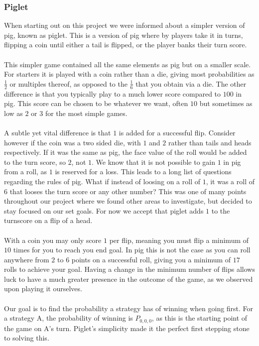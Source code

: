 \documentclass[a4paper,titlepage]{article}
\begin{document}
\subsubsection{Piglet}
When starting out on this project we were informed about a simpler version of pig, known as piglet. This is a version of pig
where by players take it in turns, flipping a coin until either a tail is flipped, or the player banks their turn score.
\\
\\
This simpler game contained all the same elements as pig but on a smaller scale. For starters it is played with a coin rather than a die,
giving most probabilities as $\frac{1}{2}$ or multiples thereof, as opposed to the $\frac{1}{6}$ that you obtain via a die.
The other difference is that you typically play to a much lower score compared to $100$ in pig. This score can be chosen to be whatever we want, often $10$ but sometimes as low as $2$ or $3$ for the most simple games.
\\
\\
A subtle yet vital difference is that $1$ is added for a successful flip. Consider however if the coin was a two sided die, with $1$ and $2$ rather than tails and heads respectively.
If it was the same as pig, the face value of the roll would be added to the turn score, so $2$, not $1$. We know that it is not possible to gain $1$ in pig from a roll, as $1$ is reserved for a loss.
This leads to a long list of questions regarding the rules of pig. What if instead of loosing on a roll of $1$, it was a roll of $6$ that looses the turn score or any other number?
This was one of many points throughout our project where we found other areas to investigate, but decided to stay focused on our set goals.
For now we accept that piglet adds $1$ to the turnscore on a flip of a head.
\\
\\
With a coin you may only score $1$ per flip, meaning you must flip a minimum of $10$ times for you to reach you end goal. In pig this is not the case as you can roll anywhere from $2$ to $6$ points on a successful roll,
giving you a minimum of $17$ rolls to achieve your goal. Having a change in the minimum number of flips allows luck to have a much greater presence in the outcome of the game, as we observed upon playing it ourselves.
\\
\\
Our goal is to find the probability a strategy has of winning when going first. For a strategy A, the probability of winning is $P_{0,0,0}$, as this is the starting point of the game on A's turn.
Piglet's simplicity made it the perfect first stepping stone to solving this.
\end{document}
